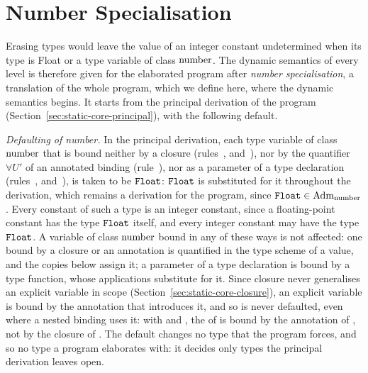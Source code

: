 \section{Number Specialisation}\label{sec:dynamic-core-numbers}

Erasing types would leave the value of an integer constant undetermined when
its type is Float or a type variable of class $\mathrm{number}$. The dynamic semantics
of every level is therefore given for the elaborated program after
\emph{number specialisation}, a translation of the whole program, which we
define here, where the dynamic semantics begins. %
It starts from the principal derivation of the program
(Section~\ref{sec:static-core-principal}), with the following default.

\emph{Defaulting of number.} In the principal derivation, each type variable
of class $\mathrm{number}$ that is bound neither by a closure
(rules~, 
and~), nor by the quantifier $\forall U'$ of an annotated
binding (rule~), nor as a parameter of a type
declaration (rules~, 
and~), is taken to be $\mathtt{Float}$: $\mathtt{Float}$ is
substituted for it throughout the derivation, which remains a derivation for
the program, since $\mathtt{Float} \in \mathrm{Adm}_{\mathrm{number}}$. Every constant of such a type is
an integer constant, since a floating-point constant has the type $\mathtt{Float}$
itself, and every integer constant may have the type $\mathtt{Float}$. %
A variable of class $\mathrm{number}$ bound in any of these ways is not affected: one
bound by a closure or an annotation is quantified in the type scheme of a value,
and the copies below assign it; a parameter of a type declaration is bound by a
type function, whose applications substitute for it.
Since closure never generalises an explicit variable in scope
(Section~\ref{sec:static-core-closure}), an explicit variable is bound by the
annotation that introduces it, and so is never defaulted, even where a nested
binding uses it: with  and
, the  of  is bound by the
annotation of , not by the closure of . %
The default changes no type that the program forces, and so no type a program
elaborates with: it decides only types the principal derivation leaves open.

